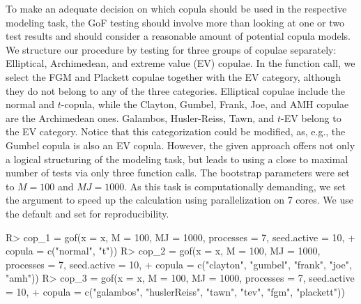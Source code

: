 \mycolor To make an adequate decision on which copula should be used in the respective modeling task, the GoF testing should involve more than looking at one or two test results and should consider a reasonable amount of potential copula models. We structure our procedure by testing for three groups of copulae separately: Elliptical, Archimedean, and extreme value (EV) copulae. In the function call, we select the FGM and Plackett copulae together with the EV category, although they do not belong to any of the three categories. Elliptical copulae include the normal and $t$-copula, while the Clayton, Gumbel, Frank, Joe, and AMH copulae are the Archimedean ones. Galambos, Husler-Reiss, Tawn, and $t$-EV belong to the EV category. Notice that this categorization could be modified, as, e.g., the Gumbel copula is also an EV copula. However, the given approach offers not only a logical structuring of the modeling task, but leads to using a close to maximal number of tests via only three function calls. The bootstrap parameters were set to $M = 100$ and $MJ = 1000$. As this task is computationally demanding, we set the argument  to speed up the calculation using parallelization on 7 cores. We use the default  and set  for reproducibility.
\begin{example}
R> cop_1 = gof(x = x, M = 100, MJ = 1000, processes = 7, seed.active = 10, 
+              copula = c("normal", "t"))
R> cop_2 = gof(x = x, M = 100, MJ = 1000, processes = 7, seed.active = 10, 
+              copula = c("clayton", "gumbel", "frank", "joe", "amh"))
R> cop_3 = gof(x = x, M = 100, MJ = 1000, processes = 7, seed.active = 10, 
+              copula = c("galambos", "huslerReiss", "tawn", "tev", "fgm", "plackett"))
\end{example}

